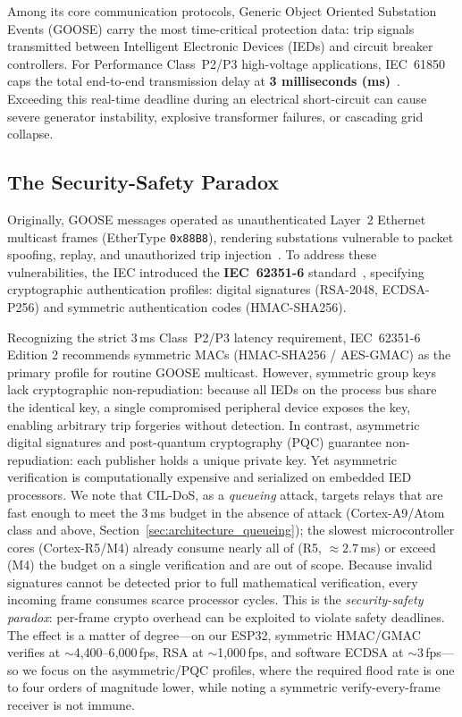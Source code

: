 \documentclass[journal]{IEEEtran}
\begin{document}
Among its core communication protocols, Generic Object Oriented Substation Events (GOOSE) carry the most time-critical protection data: trip signals transmitted between Intelligent Electronic Devices (IEDs) and circuit breaker controllers. For Performance Class~P2/P3 high-voltage applications, IEC~61850 caps the total end-to-end transmission delay at \textbf{3 milliseconds (ms)}~\cite{iec61850}. Exceeding this real-time deadline during an electrical short-circuit can cause severe generator instability, explosive transformer failures, or cascading grid collapse.

\subsection{The Security-Safety Paradox}
Originally, GOOSE messages operated as unauthenticated Layer~2 Ethernet multicast frames (EtherType \texttt{0x88B8}), rendering substations vulnerable to packet spoofing, replay, and unauthorized trip injection~\cite{schuster2017goose, hong2014cyber}. To address these vulnerabilities, the IEC introduced the \textbf{IEC~62351-6} standard~\cite{iec62351}, specifying cryptographic authentication profiles: digital signatures (RSA-2048, ECDSA-P256) and symmetric authentication codes (HMAC-SHA256).

Recognizing the strict 3\,ms Class~P2/P3 latency requirement, IEC~62351-6 Edition 2 recommends symmetric MACs (HMAC-SHA256 / AES-GMAC) as the primary profile for routine GOOSE multicast. However, symmetric group keys lack cryptographic non-repudiation: because all IEDs on the process bus share the identical key, a single compromised peripheral device exposes the key, enabling arbitrary trip forgeries without detection. In contrast, asymmetric digital signatures and post-quantum cryptography (PQC) guarantee non-repudiation: each publisher holds a unique private key. Yet asymmetric verification is computationally expensive and serialized on embedded IED processors. We note that CIL-DoS, as a \emph{queueing} attack, targets relays that are fast enough to meet the 3\,ms budget in the absence of attack (Cortex-A9/Atom class and above, Section~\ref{sec:architecture_queueing}); the slowest microcontroller cores (Cortex-R5/M4) already consume nearly all of (R5, $\approx 2.7$\,ms) or exceed (M4) the budget on a single verification and are out of scope. Because invalid signatures cannot be detected prior to full mathematical verification, every incoming frame consumes scarce processor cycles. This is the \emph{security-safety paradox}: per-frame crypto overhead can be exploited to violate safety deadlines. The effect is a matter of degree---on our ESP32, symmetric HMAC/GMAC verifies at $\sim$4{,}400--6{,}000\,fps, RSA at $\sim$1{,}000\,fps, and software ECDSA at $\sim$3\,fps---so we focus on the asymmetric/PQC profiles, where the required flood rate is one to four orders of magnitude lower, while noting a symmetric verify-every-frame receiver is not immune.
\end{document}
